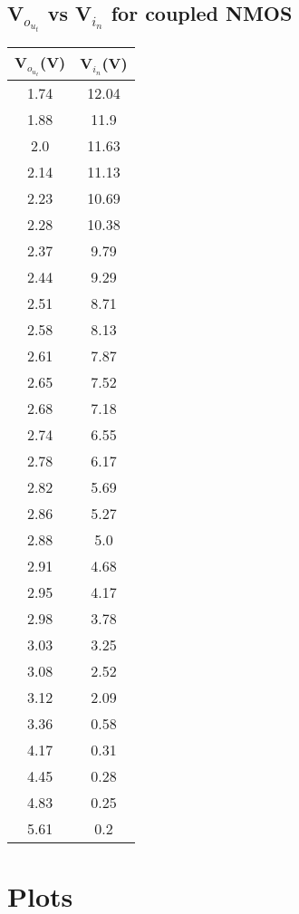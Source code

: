 \documentclass[12pt]{article}
\begin{document}
\subsection{V$_o_u_t$ vs V$_i_n$ for coupled NMOS}
\begin{center}
 \begin{tabular}{|| c | c||} 
 \hline
 V$_o_u_t$(V) &  V$_i_n$(V)\\ [0.5ex] 
 \hline\hline
 1.74 & 12.04 \\
\hline
1.88 & 11.9 \\
\hline
2.0 & 11.63 \\
\hline
2.14 & 11.13 \\
\hline
2.23 & 10.69 \\
\hline
2.28 & 10.38 \\
\hline
2.37 & 9.79 \\
\hline
2.44 & 9.29 \\
\hline
2.51 & 8.71 \\
\hline
2.58 & 8.13 \\
\hline
2.61 & 7.87 \\
\hline
2.65 & 7.52 \\
\hline
2.68 & 7.18 \\
\hline
2.74 & 6.55 \\
\hline
2.78 & 6.17 \\
\hline
2.82 & 5.69 \\
\hline
2.86 & 5.27 \\
\hline
2.88 & 5.0 \\
\hline
2.91 & 4.68 \\
\hline
2.95 & 4.17 \\
\hline
2.98 & 3.78 \\
\hline
3.03 & 3.25 \\
\hline
3.08 & 2.52 \\
\hline
3.12 & 2.09 \\
\hline
3.36 & 0.58 \\
\hline
4.17 & 0.31 \\
\hline
4.45 & 0.28 \\
\hline
4.83 & 0.25 \\
\hline
5.61 & 0.2 \\
\hline

 


\end{tabular}
\end{center}
 
 
 

\section*{Plots}
\end{document}
